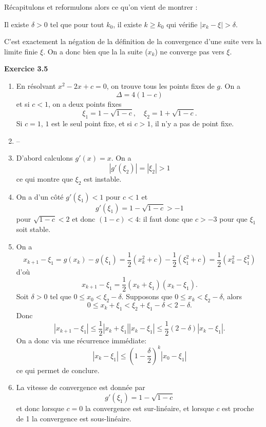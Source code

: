 \documentclass{article}
\begin{document}
\medskip

Récapitulons et reformulons alors ce qu'on vient de montrer : 

\smallskip

Il existe $\delta > 0$ tel que pour tout $k_0$, il existe $k\geq k_0$ qui vérifie $|x_k - \xi | > \delta$.

\smallskip

C'est exactement la négation de la définition de la convergence d'une suite vers la limite finie $\xi$. On a donc bien que la la suite ($x_k$) ne converge pas vers $\xi$.

\medskip

{\bf Exercice 3.5}

\begin{enumerate}
    \item En résolvant $x^2 - 2x + c = 0$, on trouve tous les points fixes de $g$.
    On a
    \[
    \Delta = 4 ( 1 - c )
    \]
    et si $c<1$, on a deux points fixes
    \[
    \xi_1 = 1 - \sqrt{1-c}, \quad
    \xi_2 = 1 + \sqrt{1-c}.
    \]
    Si $c=1$, $1$ est le seul point fixe, et si $c>1$, il n'y a pas de point fixe.
    
    \item --
    
    \item D'abord calculons $g'(x)=x$. On a
    \[
    |g'(\xi_2)| = |\xi_2| > 1
    \]
    ce qui montre que $\xi_2$ est instable.
    
    \item On a d'un côté $g'(\xi_1) < 1$ pour $c<1$ et
    \[
    g'(\xi_1) = 1 - \sqrt{1-c} > -1
    \]
    pour $\sqrt{1-c}<2$ et donc $(1-c)<4$: il faut donc que $c>-3$ pour que $\xi_1$ soit stable.
    
    \item On a
    \[
    x_{k+1} - \xi_1 = g(x_k) - g(\xi_1) = \frac12(x_k^2 + c ) - \frac12(\xi_1^2 + c) = 
    \frac12(x_k^2 - \xi^2_1 )
    \]
    d'où
    \[
    x_{k+1} - \xi_1 = \frac12 (x_k + \xi_1 )(x_k-\xi_1).
    \]
    Soit $\delta > 0$ tel que $0\leq x_0 < \xi_2 - \delta$.
    Supposons que $0\leq x_k < \xi_2 - \delta$, alors
    \[
    0 \leq x_k + \xi_1 < \xi_2 + \xi_1 - \delta < 2 - \delta.
    \]
    Donc
    \[
    |x_{k+1} - \xi_1| \leq \frac12 |x_k + \xi_1 ||x_k-\xi_1| \leq \frac12(2-\delta) |x_k-\xi_1|.
    \]
    On a donc via une récurrence immédiate:
    \[
    |x_{k} - \xi_1| \leq \left (1-\frac\delta2 \right)^k |x_0-\xi_1|
    \]
    ce qui permet de conclure.
    \item
    La vitesse de convergence est donnée par
    \[
    g'(\xi_1) = 1 - \sqrt{1-c}
    \]
    et donc lorsque $c=0$ la convergence est sur-linéaire, et lorsque $c$ est proche de 1 la convergence est sous-linéaire.
\end{enumerate}
\end{document}
